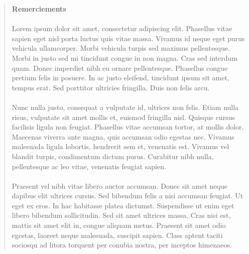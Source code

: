 \cleardoublepage{}

\thispagestyle{plain}

\hspace{3cm}

\begin{quote}

\begin{center}
  \textbf{Remerciements}
\end{center}


\paragraph{}
Lorem ipsum dolor sit amet, consectetur adipiscing elit. Phasellus vitae sapien eget nisl porta luctus quis vitae massa. Vivamus id neque eget purus vehicula ullamcorper. Morbi vehicula turpis sed maximus pellentesque. Morbi in justo sed mi tincidunt congue in non magna. Cras sed interdum quam. Donec imperdiet nibh eu ornare pellentesque. Phasellus congue pretium felis in posuere. In ac justo eleifend, tincidunt ipsum sit amet, tempus erat. Sed porttitor ultricies fringilla. Duis non felis arcu.

\paragraph{}
Nunc nulla justo, consequat a vulputate id, ultrices non felis. Etiam nulla risus, vulputate sit amet mollis et, euismod fringilla nisl. Quisque cursus facilisis ligula non feugiat. Phasellus vitae accumsan tortor, at mollis dolor. Maecenas viverra ante magna, quis accumsan odio egestas nec. Vivamus malesuada ligula lobortis, hendrerit sem et, venenatis est. Vivamus vel blandit turpis, condimentum dictum purus. Curabitur nibh nulla, pellentesque ac leo vitae, venenatis feugiat sapien.

\paragraph{}
Praesent vel nibh vitae libero auctor accumsan. Donec sit amet neque dapibus elit ultrices cursus. Sed bibendum felis a nisi accumsan feugiat. Ut eget ex eros. In hac habitasse platea dictumst. Suspendisse ut enim eget libero bibendum sollicitudin. Sed sit amet ultrices massa. Cras nisi est, mattis sit amet elit in, congue aliquam metus. Praesent sit amet odio egestas, laoreet neque malesuada, suscipit sapien. Class aptent taciti sociosqu ad litora torquent per conubia nostra, per inceptos himenaeos.


\end{quote}
